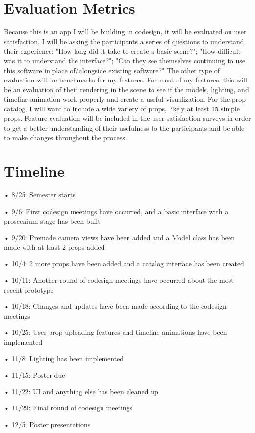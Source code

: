 \documentclass[10pt,twocolumn]{article}
\begin{document}
\section{Evaluation Metrics}
Because this is an app I will be building in codesign, it will be evaluated on user satisfaction. I will be asking the participants a series of questions to understand their experience: "How long did it take to create a basic scene?"; "How difficult was it to understand the interface?"; "Can they see themselves continuing to use this software in place of/alongside existing software?" The other type of evaluation will be benchmarks for my features. For most of my features, this will be an evaluation of their rendering in the scene to see if the models, lighting, and timeline animation work properly and create a useful visualization. For the prop catalog, I will want to include a wide variety of props, likely at least 15 simple props. Feature evaluation will be included in the user satisfaction surveys in order to get a better understanding of their usefulness to the participants and be able to make changes throughout the process. 

\section{Timeline}
 • 8/25: Semester starts

 • 9/6: First codesign meetings have occurred, and a basic interface with a proscenium stage has been built

 • 9/20: Premade camera views have been added and a Model class has been made with at least 2 props added

 • 10/4: 2 more props have been added and a catalog interface has been created

 • 10/11: Another round of codesign meetings have occurred about the most recent prototype

 • 10/18: Changes and updates have been made according to the codesign meetings

 • 10/25: User prop uploading features and timeline animations have been implemented

 • 11/8: Lighting has been implemented

 • 11/15: Poster due

 • 11/22: UI and anything else has been cleaned up

 • 11/29: Final round of codesign meetings

 • 12/5: Poster presentations
\end{document}
